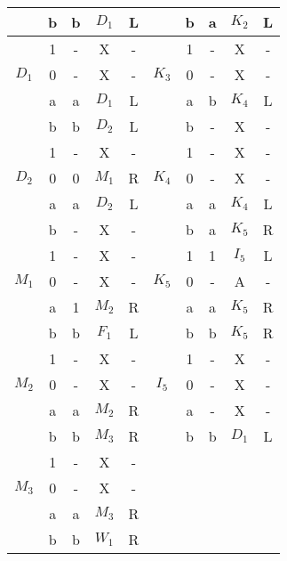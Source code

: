 \documentclass{article}
\begin{document}
\begin{center}
\begin{tabular}{c|c|c|c|c||c|c|c|c|c}
    & b & b & $D_1$ & L &       & b & a & $K_2$ & L\\\hline
    & 1 & - & X     & - &       & 1 & - & X    & -\\
    $D_1$ & 0 & - & X     & - & $K_3$ & 0 & - & X    & -\\
    & a & a & $D_1$ & L &       & a & b & $K_4$ & L\\
    & b & b & $D_2$ & L &       & b & - & X    & -\\\hline
    & 1 & - & X     & - &       & 1 & - & X & -\\
    $D_2$ & 0 & 0 & $M_1$ & R & $K_4$ & 0 & - & X    & -\\
    & a & a & $D_2$ & L &       & a & a & $K_4$ & L\\
    & b & - & X     & - &       & b & a & $K_5$ & R\\\hline
    & 1 & - & X     & - &       & 1 & 1 & $I_5$ & L\\
    $M_1$ & 0 & - & X     & - & $K_5$ & 0 & - & A    & -\\
    & a & 1 & $M_2$ & R &       & a & a & $K_5$ & R\\
    & b & b & $F_1$ & L &       & b & b & $K_5$ & R\\\hline
    & 1 & - & X     & - &       & 1 & - & X    & -\\
    $M_2$ & 0 & - & X     & - & $I_5$ & 0 & - & X    & -\\
    & a & a & $M_2$ & R &       & a & - & X    & -\\
    & b & b & $M_3$ & R &       & b & b & $D_1$ & L\\\hline
    & 1 & - & X     & - &       & & & & \\
    $M_3$ & 0 & - & X     & - &       & & & &\\
    & a & a & $M_3$ & R &       & & & &\\
    & b & b & $W_1$ & R &       & & & & \\\hline
  \end{tabular}
\end{center}
\end{document}
